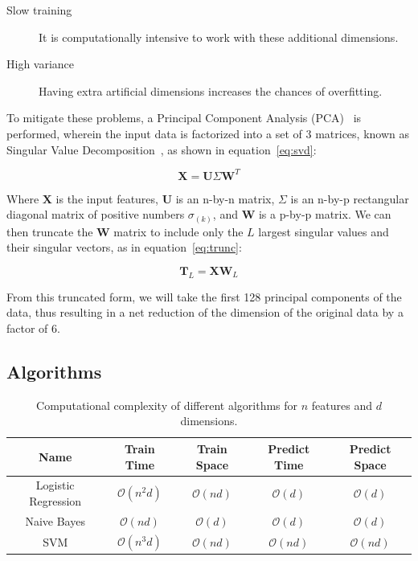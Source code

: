 \documentclass[landscape,twocolumn]{article}
\begin{document}
\begin{description}
	\item[Slow training] It is computationally intensive to work with these additional dimensions.
	\item[High variance] Having extra artificial dimensions increases the chances of overfitting.
\end{description}

To mitigate these problems, a Principal Component Analysis (PCA)~\cite{wold1987principal} is performed, wherein the input data is factorized into a set of 3 matrices, known as Singular Value Decomposition~\cite{golub1971singular}, as shown in equation~\ref{eq:svd}:

\begin{equation}
	\label{eq:svd}
	\textbf{X}=\textbf{U}\Sigma\textbf{W}^T
\end{equation}

Where $\textbf{X}$ is the input features, $\textbf{U}$ is an n-by-n matrix, $\Sigma$ is an n-by-p rectangular diagonal matrix of positive numbers $\sigma_{\left(k\right)}$, and $\textbf{W}$ is a p-by-p matrix. We can then truncate the $\textbf{W}$ matrix to include only the $L$ largest singular values and their singular vectors, as in equation~\ref{eq:trunc}:

\begin{equation}
	\label{eq:trunc}
	\textbf{T}_L=\textbf{X}\textbf{W}_L
\end{equation}

From this truncated form, we will take the first 128 principal components of the data, thus resulting in a net reduction of the dimension of the original data by a factor of 6.

\subsection{Algorithms}
\begin{table}
	\begin{tabular}{ccccc}
		\textbf{Name} & \textbf{Train Time} & \textbf{Train Space} & \textbf{Predict Time} & \textbf{Predict Space} \\\toprule
		Logistic Regression & $\mathcal{O}\left(n^2d\right)$ & $\mathcal{O}\left(nd\right) $ & $\mathcal{O}\left(d\right)$ & $\mathcal{O}\left(d\right)$\\
		Naive Bayes & $\mathcal{O}\left(nd\right)$ & $\mathcal{O}\left(d\right)$ & $\mathcal{O}\left(d\right)$ & $\mathcal{O}\left(d\right)$\\
		SVM & $\mathcal{O}\left(n^3d\right)$ & $\mathcal{O}\left(nd\right)$ & $\mathcal{O}\left(nd\right)$ & $\mathcal{O}\left(nd\right)$\\
	\end{tabular}
	\caption{Computational complexity of different algorithms for $n$ features and $d$ dimensions.}\label{tab:algorithms}
\end{table}
\end{document}
